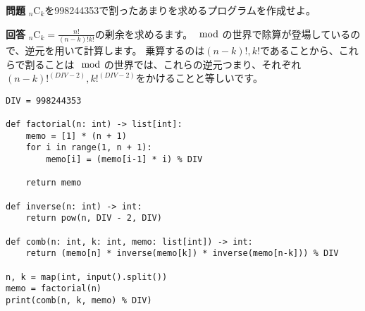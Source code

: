   \begin{tcolorbox}[enhanced,
    colback=white!85!gray,
    drop fuzzy shadow,
    boxrule=0.3mm,
    arc=0mm,
    left=0pt,
    top=0pt,
    sharp corners,
    width=\textwidth,
    ]
    \textbf{問題}
    ${}_n \mathrm{C}_k$を998244353で割ったあまりを求めるプログラムを作成せよ。
  \tcblower

  \begin{tcolorbox}[
    coltext=white!10!blue,
    colback=white!90!purple!90!blue,
    drop fuzzy shadow,
    boxrule=0mm,
    arc=0mm,
    width=1.3cm,
    left=0pt,
    right=0pt,
    top=0pt,
    bottom=0pt,
    halign=flush left,
  ]
  \end{tcolorbox}
  \tcblower
  \textbf{回答} 
  ${}_n \mathrm{C}_k = \frac{n!}{(n - k)! k!}$の剰余を求めるます。$\mod$の世界で除算が登場しているので、逆元を用いて計算します。
  乗算するのは$(n - k)!, k!$であることから、これらで割ることは$\mod$の世界では、これらの逆元つまり、それぞれ$(n - k)!^{(DIV-2)}, k!^{(DIV-2)}$をかけることと等しいです。
  \begin{lstlisting}[caption=${}_n \mathrm{C}_k$を求める, label=combination]
DIV = 998244353

def factorial(n: int) -> list[int]:
    memo = [1] * (n + 1)
    for i in range(1, n + 1):
        memo[i] = (memo[i-1] * i) % DIV
    
    return memo

def inverse(n: int) -> int:
    return pow(n, DIV - 2, DIV)

def comb(n: int, k: int, memo: list[int]) -> int:
    return (memo[n] * inverse(memo[k]) * inverse(memo[n-k])) % DIV
 
n, k = map(int, input().split())
memo = factorial(n)
print(comb(n, k, memo) % DIV)
  \end{lstlisting}
  \end{tcolorbox}%
